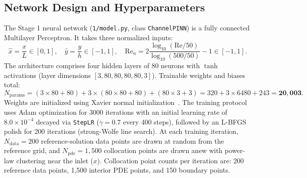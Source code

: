 \documentclass[11pt,a4paper]{article}
\begin{document}
\subsection{Network Design and Hyperparameters}
The Stage 1 neural network (\texttt{1/model.py}, class \texttt{ChannelPINN}) is a fully connected Multilayer Perceptron. It takes three normalized inputs:
\begin{equation}
\hat{x} = \frac{x}{L} \in [0, 1], \quad \hat{y} = \frac{y}{h} \in [-1, 1], \quad \mathrm{Re}_n = 2\frac{\log_{10}(\mathrm{Re}/50)}{\log_{10}(500/50)} - 1 \in [-1, 1].
\end{equation}
The architecture comprises four hidden layers of 80 neurons with $\tanh$ activations (layer dimensions $[3, 80, 80, 80, 80, 3]$). Trainable weights and biases total:
\begin{equation}
N_{\mathrm{params}} = (3\times 80 + 80) + 3\times (80\times 80 + 80) + (80\times 3 + 3) = 320 + 3\times 6480 + 243 = \mathbf{20{,}003}.
\end{equation}
Weights are initialized using Xavier normal initialization~\cite[Eq.~(12), p.~253]{glorot2010}. The training protocol uses Adam optimization for 3000 iterations with an initial learning rate of $8.0\times 10^{-4}$ decayed via \texttt{StepLR} ($\gamma=0.7$ every 400 steps), followed by an L-BFGS polish for 200 iterations (strong-Wolfe line search). At each training iteration, $N_{\mathrm{data}} = 200$ reference-solution data points are drawn at random from the reference grid, and $N_{\mathrm{pde}} = 1{,}500$ collocation points are drawn anew with power-law clustering near the inlet ($x$). Collocation point counts per iteration are: 200 reference data points, 1,500 interior PDE points, and 150 boundary points.
\end{document}
